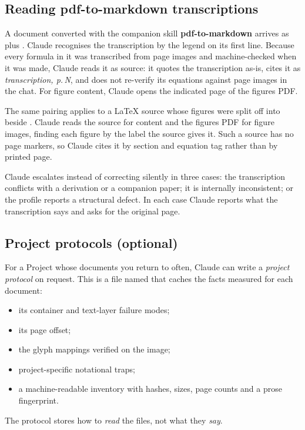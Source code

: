 \documentclass[11pt,a4paper]{article}
\begin{document}
\subsection{Reading pdf-to-markdown transcriptions}\label{sec:p2m}
A document converted with the companion skill \textbf{pdf-to-markdown} arrives as
 plus . Claude recognises the transcription by the legend
on its first line. Because every formula in it was transcribed from page images and
machine-checked when it was made, Claude reads it as source: it quotes the transcription
as-is, cites it as \emph{transcription, p.\,N}, and does not re-verify its equations against
page images in the chat. For figure content, Claude opens the indicated page of the figures
PDF.

The same pairing applies to a LaTeX source whose figures were split off into
 beside . Claude reads the source for content and the
figures PDF for figure images, finding each figure by the label the source gives it. Such a
source has no page markers, so Claude cites it by section and equation tag rather than by
printed page.

Claude escalates instead of correcting silently in three cases: the transcription conflicts
with a derivation or a companion paper; it is internally inconsistent; or the profile reports
a structural defect. In each case Claude reports what the transcription says and asks for the
original page.

\subsection{Project protocols (optional)}\label{sec:protocol}
For a Project whose documents you return to often, Claude can write a \emph{project protocol}
on request. This is a file named  that caches the facts
measured for each document:
\begin{itemize}
\item its container and text-layer failure modes;
\item its page offset;
\item the glyph mappings verified on the image;
\item project-specific notational traps;
\item a machine-readable inventory with hashes, sizes, page counts and a prose fingerprint.
\end{itemize}
The protocol stores how to \emph{read} the files, not what they \emph{say}.
\end{document}
